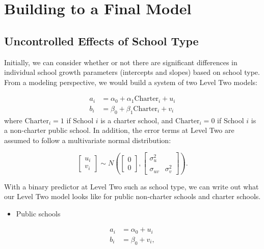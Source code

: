 \documentclass[
]{krantz}
\providecommand{\tightlist}{%
  \setlength{\itemsep}{0pt}\setlength{\parskip}{0pt}}
\begin{document}
\section{Building to a Final Model}\label{finalmodel}

\subsection{Uncontrolled Effects of School Type}\label{sec:modelc9}

Initially, we can consider whether or not there are significant differences in individual school growth parameters (intercepts and slopes) based on school type. From a modeling perspective, we would build a system of two Level Two models:

\begin{align*}
a_{i} & = \alpha_{0} + \alpha_{1}\textrm{Charter}_i + u_{i} \\
b_{i} & = \beta_{0} + \beta_{1}\textrm{Charter}_i + v_{i}
\end{align*}
where \(\textrm{Charter}_i=1\) if School \(i\) is a charter school, and \(\textrm{Charter}_i=0\) if School \(i\) is a non-charter public school. In addition, the error terms at Level Two are assumed to follow a multivariate normal distribution:

\[ \left[ \begin{array}{c}
            u_{i} \\ v_{i}
          \end{array}  \right] \sim N \left( \left[
          \begin{array}{c}
            0 \\ 0
          \end{array} \right], \left[
          \begin{array}{cc}
            \sigma_{u}^{2} & \\
            \sigma_{uv} & \sigma_{v}^{2}
          \end{array} \right] \right) . \]

With a binary predictor at Level Two such as school type, we can write out what our Level Two model looks like for public non-charter schools and charter schools.

\begin{itemize}
\tightlist
\item
  Public schools
\end{itemize}

\begin{align*}
a_{i} & = \alpha_{0} + u_{i}\\
b_{i} & = \beta_{0} + v_{i},
\end{align*}
\end{document}
